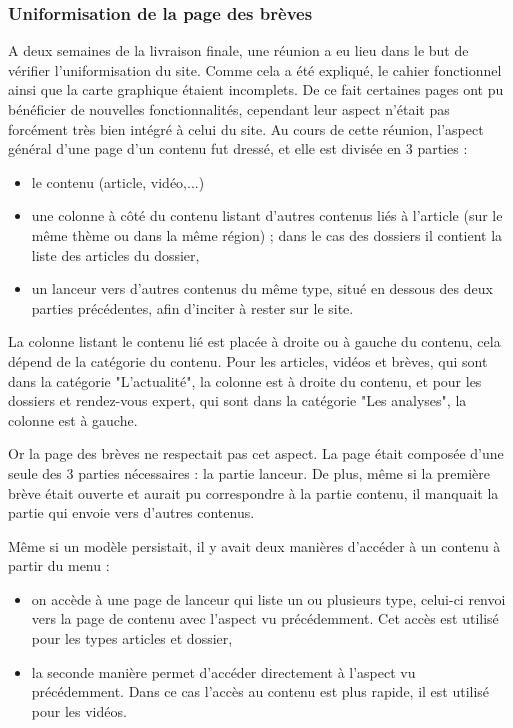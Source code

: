 \documentclass[12pt,a4paper]{article}
\begin{document}
\subsubsection{Uniformisation de la page des brèves}
A deux semaines de la livraison finale, une réunion a eu lieu dans le but de vérifier l'uniformisation du site. Comme cela a été expliqué, le cahier fonctionnel ainsi que la carte graphique étaient incomplets. De ce fait certaines pages ont pu bénéficier de nouvelles fonctionnalités, cependant leur aspect n'était pas forcément très bien intégré à celui du site. Au cours de cette réunion, l'aspect général d'une page d'un contenu fut dressé, et elle est divisée en 3 parties :
\begin{itemize}
\item le contenu (article, vidéo,...)
\item une colonne à côté du contenu listant d'autres contenus liés à l'article (sur le même thème ou dans la même région) ; dans le cas des dossiers il contient la liste des articles du dossier,
\item un lanceur vers d'autres contenus du même type, situé en dessous des deux parties précédentes, afin d'inciter à rester sur le site.
\end{itemize}\par
La colonne listant le contenu lié est placée à droite ou à gauche du contenu, cela dépend de la catégorie du  contenu. Pour les articles, vidéos et brèves, qui sont dans la catégorie "L'actualité", la colonne est à droite du contenu, et pour les dossiers et rendez-vous expert, qui sont dans la catégorie "Les analyses", la colonne est à gauche.\par
\bigskip
Or la page des brèves ne respectait pas cet aspect. La page était composée d'une seule des 3 parties nécessaires : la partie lanceur. De plus, même si la première brève était ouverte et aurait pu correspondre à la partie contenu,  il manquait la partie qui envoie vers d'autres contenus.\par 
Même si un modèle persistait, il y avait deux manières d'accéder à un contenu à partir du menu : 
\begin{itemize}
\item on accède à une page de lanceur qui liste un ou plusieurs type, celui-ci renvoi vers la page de contenu avec l'aspect vu précédemment. Cet accès est utilisé pour les types articles et dossier,
\item la seconde manière permet d'accéder directement à l'aspect vu précédemment. Dans ce cas l'accès au contenu est plus rapide, il est utilisé pour les vidéos. 
\end{itemize}\par 
\end{document}
